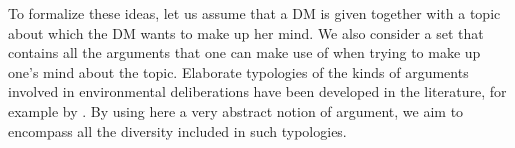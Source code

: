 \documentclass[version=3.21, pagesize, twoside=off, bibliography=totoc, DIV=calc, fontsize=12pt, a4paper, french, english]{scrartcl}
\begin{document}

To formalize these ideas, let us assume that a \ac{DM} is given together with a topic about which the \ac{DM} wants to make up her mind.
We also consider a set that contains all the arguments that one can make use of when trying to make up one’s mind about the topic.
Elaborate typologies of the kinds of arguments involved in environmental deliberations have been developed in the literature, for example by \citet{chateauraynaud_contrainte_2007}. 
By using here a very abstract notion of argument, we aim to encompass all the diversity included in such typologies. 
\end{document}

